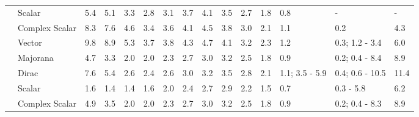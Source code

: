 \documentclass[notitlepage,letterpaper,natbib,aps,prd,onecolumn,amsmath,amsfonts,nofootinbib,preprintnumbers,superscriptaddress,secnumarabic,groupedaddress]{revtex4-1}
\begin{document}
\begin{table}[h]
{\begin{tabular}{c|l|p{0.7cm}|p{0.7cm}|p{0.7cm}|p{0.7cm}|p{0.7cm}|p{0.7cm}|p{0.7cm}|p{0.7cm}|p{0.7cm}|p{0.7cm}|p{2.08cm}|p{2.08cm}|p{0.7cm}}
                          & Scalar     & \hfil 5.4           & \hfil 5.1            & \hfil 3.3            & \hfil 2.8            & \hfil 3.1            & \hfil 3.7            & \hfil 4.1       & \hfil 3.5            & \hfil 2.7            & \hfil 1.8            & \hfil 0.8            & \hfil -           & \hfil -            \\
                          & Complex Scalar &   \hfil 8.3         & \hfil 7.6           & \hfil 4.6           & \hfil 3.4           & \hfil 3.6           & \hfil 4.1           & \hfil 4.5      & \hfil 3.8           & \hfil 3.0           & \hfil 2.1           & \hfil 1.1           & \hfil 0.2           & \hfil 4.3           \\
                          & Vector         & \hfil 9.8           & \hfil 8.9          & \hfil 5.3          & \hfil 3.7          & \hfil 3.8           & \hfil 4.3           & \hfil 4.7      & \hfil 4.1          & \hfil 3.2           &  \hfil 2.3          & \hfil 1.2          & \hfil 0.3; 1.2 - 3.4          & \hfil 6.0          \\
                        \hline
\parbox[t]{5mm}{}     & Majorana     &  \hfil 4.7          &  \hfil 3.3          &     \hfil 2.0       &  \hfil   2.0        &   \hfil 2.3         & \hfil 2.7           & \hfil 3.0      & \hfil 3.2    &  \hfil 2.5      & \hfil  1.8          &     \hfil 0.9       &  \hfil 0.2; 0.4 - 8.4 &\hfil   8.9 \\
                          & Dirac         &   \hfil 7.6         & \hfil 5.4           &     \hfil 2.6       &     \hfil 2.4       & \hfil 2.6           &     \hfil 3.0       & \hfil 3.2      &  \hfil 3.5          &  \hfil 2.8          &  \hfil 2.1          &  \hfil 1.1; 3.5 - 5.9          &   \hfil 0.4; 0.6 - 10.5         &  \hfil 11.4          \\
                          & Scalar     & \hfil  1.6          & \hfil    1.4         & \hfil 1.4            & \hfil   1.6          & \hfil  2.0           & \hfil    2.4         & \hfil 2.7       & \hfil 2.9            & \hfil    2.2         & \hfil 1.5            & \hfil 0.7            & \hfil 0.3 - 5.8           & \hfil     6.2        \\
                          & Complex Scalar &   \hfil 4.9         & \hfil    3.5        & \hfil 2.0           & \hfil    2.0        & \hfil  2.3          & \hfil    2.7        & \hfil 3.0      & \hfil 3.2           & \hfil 2.5           & \hfil     1.8       & \hfil 0.9           & \hfil 0.2; 0.4 - 8.3            & \hfil    8.9        \\

\end{tabular}}
\end{table}
\end{document}
